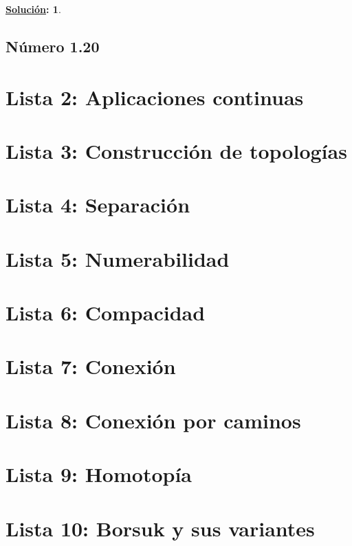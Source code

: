 \documentclass[10pt,a4paper,openright]{book}
\theoremstyle{break}
\newtheorem*{sol}{\underline{Solución}:}
\begin{document}
\begin{sol}
\end{sol}

\section*{\Lightning Número 1.20}
\chapter{Lista 2: Aplicaciones continuas}%
\label{cha:lista2}

\chapter{Lista 3: Construcción de topologías}%
\label{cha:lista3}

\chapter{Lista 4: Separación}%
\label{cha:lista4}

\chapter{Lista 5: Numerabilidad}%
\label{cha:lista5}

\chapter{Lista 6: Compacidad}%
\label{cha:lista6}

\chapter{Lista 7: Conexión}%
\label{cha:lista7}

\chapter{Lista 8: Conexión por caminos}%
\label{cha:lista8}

\chapter{Lista 9: Homotopía}%
\label{cha:lista9}

\chapter{Lista 10: Borsuk y sus variantes}%
\label{cha:lista10}
\end{document}
